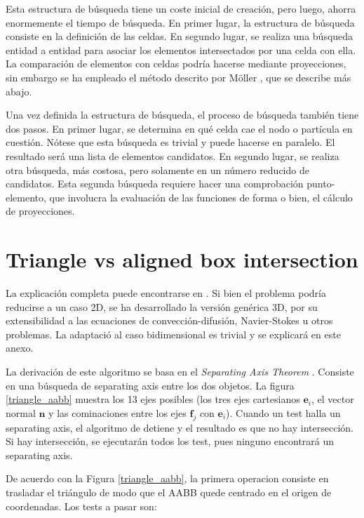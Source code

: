 Esta estructura de búsqueda tiene un coste inicial de creación, pero luego, ahorra enormemente el tiempo de búsqueda. En primer lugar, la estructura de búsqueda consiste en la definición de las celdas. En segundo lugar, se realiza una búsqueda entidad a entidad para asociar los elementos intersectados por una celda con ella. La comparación de elementos con celdas podría hacerse mediante proyecciones, sin embargo se ha empleado el método descrito por Möller \cite{moller2004}, que se describe más abajo.

Una vez definida la estructura de búsqueda, el proceso de búsqueda también tiene dos pasos. En primer lugar, se determina en qué celda cae el nodo o partícula en cuestión. Nótese que esta búsqueda es trivial y puede hacerse en paralelo. El resultado será una lista de elementos candidatos. En segundo lugar, se realiza otra búsqueda, más costosa, pero solamente en un número reducido de candidatos. Esta segunda búsqueda requiere hacer una comprobación punto-elemento, que involucra la evaluación de las funciones de forma o bien, el cálculo de proyecciones.



\section{Triangle vs aligned box intersection}

La explicación completa puede encontrarse en \cite{moller2004}. Si bien el problema podría reducirse a un caso 2D, se ha desarrollado la versión genérica 3D, por su extensibilidad a las ecuaciones de convección-difusión, Navier-Stokes u otros problemas. La adaptació al caso bidimensional es trivial y se explicará en este anexo.

La derivación de este algoritmo se basa en el \emph{Separating Axis Theorem} \cite{gottschalk1996}. Consiste en una búsqueda de separating axis entre los dos objetos. La figura \ref{triangle_aabb} muestra los 13 ejes posibles (los tres ejes cartesianos $\mathbf{e}_i$, el vector normal $\mathbf{n}$ y las cominaciones entre los ejes $\mathbf{f}_j$ con $\mathbf{e}_i$). Cuando un test halla un separating axis, el algoritmo de detiene y el resultado es que no hay intersección. Si hay intersección, se ejecutarán todos los test, pues ninguno encontrará un separating axis.

De acuerdo con la Figura \ref{triangle_aabb}, la primera operacion consiste en trasladar el triángulo de modo que el AABB quede centrado en el origen de coordenadas. Los tests a pasar son:

